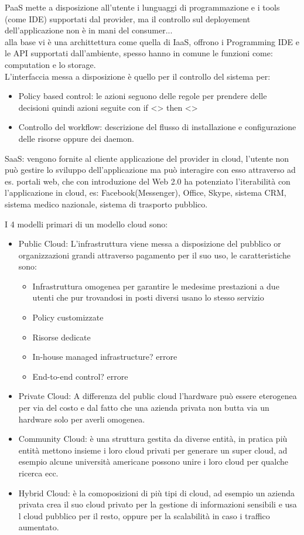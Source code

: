 \documentclass[11pt, twocolumn]{article}
\begin{document}
PaaS mette a disposizione all'utente i lunguaggi di programmazione e i tools (come IDE) supportati dal provider, ma il controllo sul deployement dell'applicazione non è in mani del consumer...
\\
alla base vi è una archittettura come quella di IaaS, offrono i Programming IDE e le API supportati dall'ambiente, spesso hanno in comune le funzioni come: computation e lo storage.
\\
L'interfaccia messa a disposizione è quello per il controllo del sistema per:
\begin{itemize}
	\item Policy based control: le azioni seguono delle regole per prendere delle decisioni quindi azioni seguite con if <> then <>
	\item Controllo del workflow: descrizione del flusso di installazione e configurazione delle risorse oppure dei daemon.
\end{itemize}

SaaS: vengono fornite al cliente applicazione del provider in cloud, l'utente non può gestire lo sviluppo dell'applicazione ma può interagire con esso attraverso ad es. portali web, che con introduzione del Web 2.0 ha potenziato l'iterabilità con l'applicazione in cloud, es: Facebook(Messenger), Office, Skype, sistema CRM, sistema medico nazionale, sistema di trasporto pubblico.

I 4 modelli primari di un modello cloud sono:
\begin{itemize}
	\item Public Cloud: L'infrastruttura viene messa a disposizione del pubblico or organizzazioni grandi attraverso pagamento per il suo uso, le caratteristiche sono:
	\begin{itemize}
		\item Infrastruttura omogenea per garantire le medesime prestazioni a due utenti che pur trovandosi in posti diversi usano lo stesso servizio
		\item Policy customizzate
		\item Risorse dedicate
		\item In-house managed infrastructure? errore
		\item End-to-end control? errore
	\end{itemize} 
	\item Private Cloud:
	A differenza del public cloud l'hardware può essere eterogenea per via del costo e dal fatto che una azienda privata non butta via un hardware solo per averli omogenea.
	\item Community Cloud: è una struttura gestita da diverse entità, in pratica più entità mettono insieme i loro cloud privati per generare un super cloud, ad esempio alcune università americane possono unire i loro cloud per qualche ricerca ecc.
	\item Hybrid Cloud: è la comoposizioni di più tipi di cloud, ad esempio un azienda privata crea il suo cloud privato per la gestione di informazioni sensibili e usa l cloud pubblico per il resto, oppure per la scalabilità in caso i traffico aumentato.
\end{itemize}
\end{document}
